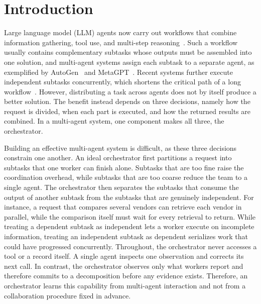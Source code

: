 \section{Introduction}
\label{sec:intro}

Large language model (LLM) agents now carry out workflows that combine information gathering, tool use, and multi-step reasoning~\citep{yao2023react,schick2023toolformer,qin2024toolllm}.
Such a workflow usually contains complementary subtasks whose outputs must be assembled into one solution, and multi-agent systems assign each subtask to a separate agent, as exemplified by AutoGen~\citep{wu2023autogenenablingnextgenllm} and MetaGPT~\citep{hong2024metagptmetaprogrammingmultiagent}.
Recent systems further execute independent subtasks concurrently, which shortens the critical path of a long workflow~\citep{anthropic2025multiagent,kimiteam2026kimik25}.
However, distributing a task across agents does not by itself produce a better solution.
The benefit instead depends on three decisions, namely how the request is divided, when each part is executed, and how the returned results are combined.
In a multi-agent system, one component makes all three, the orchestrator.

Building an effective multi-agent system is difficult, as these three decisions constrain one another.
An ideal orchestrator first partitions a request into subtasks that one worker can finish alone.
Subtasks that are too fine raise the coordination overhead, while subtasks that are too coarse reduce the team to a single agent.
The orchestrator then separates the subtasks that consume the output of another subtask from the subtasks that are genuinely independent.
For instance, a request that compares several vendors can retrieve each vendor in parallel, while the comparison itself must wait for every retrieval to return.
While treating a dependent subtask as independent lets a worker execute on incomplete information, treating an independent subtask as dependent serializes work that could have progressed concurrently.
Throughout, the orchestrator never accesses a tool or a record itself.
A single agent inspects one observation and corrects its next call.
In contrast, the orchestrator observes only what workers report and therefore commits to a decomposition before any evidence exists.
Therefore, an orchestrator learns this capability from multi-agent interaction and not from a collaboration procedure fixed in advance.

